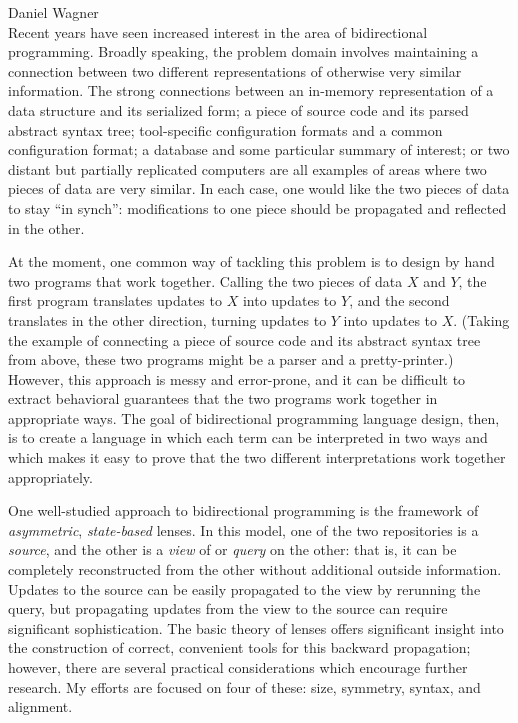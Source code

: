 \documentclass{article}
\begin{document}
{\noindent Daniel Wagner}\\[0ex]

Recent years have seen increased interest in the area of bidirectional
programming. Broadly speaking, the problem domain involves maintaining a
connection between two different representations of otherwise very similar
information. The strong connections between an in-memory representation of a
data structure and its serialized form; a piece of source code and its
parsed abstract syntax tree; tool-specific configuration formats and a
common configuration format; a database and some particular summary of
interest; or two distant but partially replicated computers are all examples
of areas where two pieces of data are very similar. In each case, one would
like the two pieces of data to stay ``in synch'': modifications to one piece
should be propagated and reflected in the other.

At the moment, one common way of tackling this problem is to design by hand
two programs that work together. Calling the two pieces of data $X$ and $Y$,
the first program translates updates to $X$ into updates to $Y$, and the
second translates in the other direction, turning updates to $Y$ into
updates to $X$. (Taking the example of connecting a piece of source code and
its abstract syntax tree from above, these two programs might be a parser
and a pretty-printer.) However, this approach is messy and error-prone, and
it can be difficult to extract behavioral guarantees that the two programs
work together in appropriate ways. The goal of bidirectional programming
language design, then, is to create a language in which each term can be
interpreted in two ways and which makes it easy to prove that the two
different interpretations work together appropriately.

One well-studied approach to bidirectional programming is the framework of
\emph{asymmetric}, \emph{state-based} lenses. In this model, one of the two
repositories is a \emph{source}, and the other is a \emph{view} of or
\emph{query} on the other: that is, it can be completely reconstructed from
the other without additional outside information. Updates to the source can
be easily propagated to the view by rerunning the query, but propagating
updates from the view to the source can require significant sophistication.
The basic theory of lenses offers significant insight into the construction
of correct, convenient tools for this backward propagation; however, there
are several practical considerations which encourage further research. My
efforts are focused on four of these: size, symmetry, syntax, and alignment.
\end{document}
